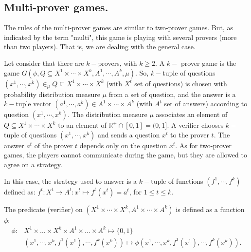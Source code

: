 





\subsection{Multi-prover games.} The rules of the multi-prover games are similar to two-prover games. But, as indicated by the term "multi", this game is playing with several provers (more than two players). That is, we are dealing with the general case.

Let consider that there are $k-$provers, with $k \geq 2$. A $k-$ prover  game is the game $G(\phi, Q \subseteq X^1  \times \cdots \times X^k , A^1 , \cdots,  A^k, \mu) $. So, $k-$tuple of questions $(x^1, \cdots , x^k) \in_{\mu} Q \subseteq X^1  \times \cdots \times X^k $ (with $X^t$ set of questions)
is chosen with probability distribution measure $\mu $ from a set of question,
and the answer is a $k-$tuple vector $(a^1, \cdots , a^k)  \in A^1 \times \cdots \times A^k$ (with $A^t$ set of answers) according to question $(x^1, \cdots , x^k).$ The distribution measure $\mu $ associates an element of $ Q \subseteq  X^1  \times \cdots \times X^k $ to an element of $\mathbb{R}^+ \cap [0,1]= (0, 1].$
A verifier chooses $k-$tuple of questions $(x^1, \cdots , x^k)$ and sends a question $x^t$ to the prover $t$. The answer $a^t$ of the prover $t$ depends only on the question $x^t.$ As for two-prover games, the players cannot communicate during the game, but they are allowed to agree on a strategy. 

In this case, the strategy used to answer is a $k-$tuple of functions $(f^1, \cdots , f^k)$ defined as:
$f^t: X^t \longrightarrow A^t: x^t \longmapsto f^t(x^t)=a^t$, for $1\leq t \leq k.$

The predicate (verifier) on $( X^1 \times \cdots \times X^k, A^1 \times \cdots \times A^k)$ is defined as a function $\phi$:
\begin{align*}
\phi : & X^1 \times \ldots \times X^k \times A^1 \times \ldots \times A^k \longmapsto \{0,1\} \\
& (x^1, \cdots , x^k, f^1(x^1), \cdots , f^k(x^k)) \longmapsto \phi (x^1, \cdots , x^k, f^1(x^1), \cdots , f^k(x^k)).
\end{align*}

